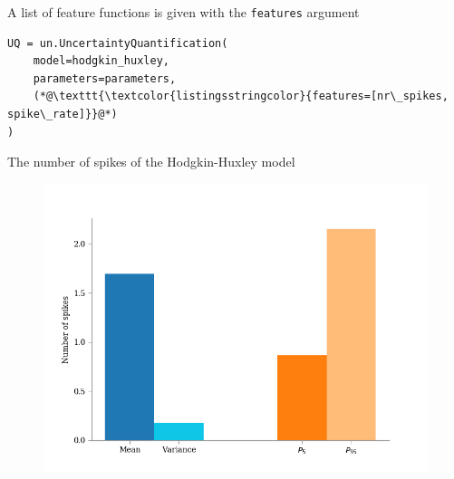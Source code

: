 \documentclass[presentation]{beamer}
\begin{document}

\begin{frame}[fragile]{A list of feature functions is given with the
  \lstinline|features| argument}

  \begin{lstlisting}
UQ = un.UncertaintyQuantification(
    model=hodgkin_huxley,
    parameters=parameters,
    (*@\texttt{\textcolor{listingsstringcolor}{features=[nr\_spikes, spike\_rate]}}@*)
)
  \end{lstlisting}
\end{frame}




\begin{frame}{The number of spikes of the Hodgkin-Huxley model}
  \vspace{-5mm}

  \begin{figure}
      \includegraphics[width=1\textwidth]{nr_spikes.png}
  \end{figure}

\end{frame}


\end{document}
